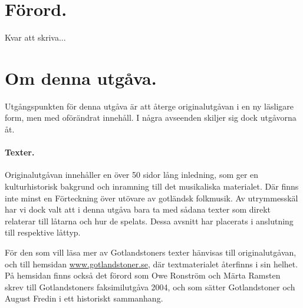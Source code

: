 \fancyhfoffset[E,O]{0pt}
\addtolength{\skip\footins}{\baselineskip}
{
\setlength{\parindent}{1.5em}



\section*{\centering \LARGE Förord.}\vspace{1cm}

Kvar att skriva...



\clearpage


\section*{\centering \LARGE Om denna utgåva.}\vspace{1cm}



Utgångspunkten för denna utgåva är att återge originalutgåvan i en ny läsligare
form, men med oförändrat innehåll. I några avseenden skiljer sig dock utgåvorna åt.

\paragraph{Texter.} Originalutgåvan innehåller en över 50 sidor lång inledning,
som ger en kulturhistorisk bakgrund och inramning till det musikaliska materialet.
Där finns inte minst en \guillemotright{}Förteckning över utövare av gotländsk
folkmusik\guillemotright{}.
Av utrymmesskäl har vi dock valt att i denna utgåva bara ta med sådana texter
som direkt relaterar till låtarna och hur de spelats. Dessa avsnitt
har placerats i anslutning till respektive låttyp.

För den som vill läsa mer av Gotlandstoners texter hänvisas till originalutgåvan,
och till hemsidan \href{http://www.gotlandstoner.se/}{www.gotlandstoner.se}, där textmaterialet återfinns i sin helhet.
På hemsidan finns också det förord som Owe Ronström och
Märta Ramsten skrev till Gotlandstoners faksimilutgåva 2004, och som
sätter Gotlandstoner och August Fredin i ett historiskt sammanhang.

}
